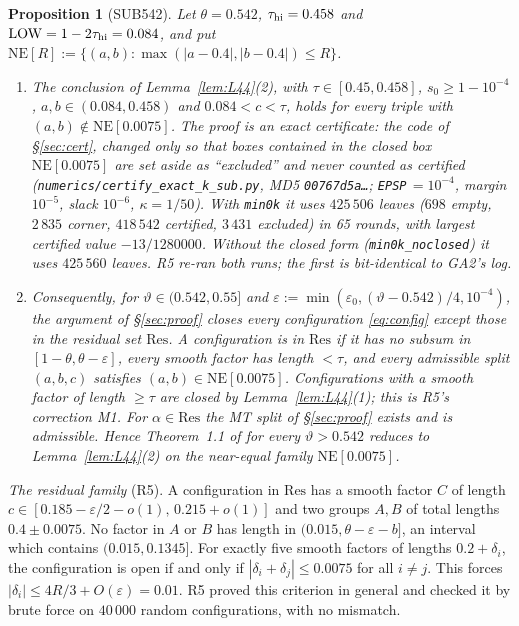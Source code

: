 \documentclass[11pt]{amsart}
\newtheorem{proposition}[theorem]{Proposition}
\theoremstyle{definition}
\theoremstyle{remark}
\newcommand{\e}{\varepsilon}
\newcommand{\Lfp}{Lemma~\ref{lem:L44}}
\begin{document}
\begin{proposition}[SUB542]\label{prop:sub542}
Let $\theta=0.542$, $\tau_{\rm hi}=0.458$ and $\mathrm{LOW}=1-2\tau_{\rm hi}=0.084$, and put
$\mathrm{NE}[R]:=\{(a,b):\max(|a-0.4|,|b-0.4|)\le R\}$.
\begin{enumerate}[label=(\roman*),leftmargin=*]
\item The conclusion of \Lfp(2), with $\tau\in[0.45,0.458]$, $s_0\ge1-10^{-4}$, $a,b\in(0.084,0.458)$ and $0.084<c<\tau$, holds for every
triple with $(a,b)\notin\mathrm{NE}[0.0075]$. The proof is an exact certificate: the code of \S\ref{sec:cert}, changed only so that boxes
contained in the closed box $\mathrm{NE}[0.0075]$ are set aside as ``excluded'' and never counted as certified
(\nolinkurl{numerics/certify_exact_k_sub.py}, MD5 \texttt{00767d5a\dots}; \texttt{EPSP}$\,=10^{-4}$, margin $10^{-5}$, slack $10^{-6}$, $\kappa=1/50$).
With \texttt{min0k} it uses $425\,506$ leaves ($698$ empty, $2\,835$ corner, $418\,542$ certified, $3\,431$ excluded) in 65 rounds, with largest
certified value $-13/1280000$. Without the closed form (\texttt{min0k\_noclosed}) it uses $425\,560$ leaves. R5 re-ran both runs; the first is
bit-identical to GA2's log.
\item Consequently, for $\vartheta\in(0.542,0.55]$ and $\e:=\min(\e_0,(\vartheta-0.542)/4,10^{-4})$, the argument of \S\ref{sec:proof} closes every
configuration \eqref{eq:config} except those in the residual set $\mathrm{Res}$. A configuration is in $\mathrm{Res}$ if it has no subsum in
$[1-\theta,\theta-\e]$, every smooth factor has length $<\tau$, and every admissible split $(a,b,c)$ satisfies $(a,b)\in\mathrm{NE}[0.0075]$.
Configurations with a smooth factor of length $\ge\tau$ are closed by \Lfp(1); this is R5's correction M1. For $\alpha\in\mathrm{Res}$ the MT split of
\S\ref{sec:proof} exists and is admissible. Hence Theorem~1.1 of \cite{MT} for every $\vartheta>0.542$ reduces to \Lfp(2) on the near-equal family
$\mathrm{NE}[0.0075]$.
\end{enumerate}
\end{proposition}

\emph{The residual family} (R5). A configuration in $\mathrm{Res}$ has a smooth factor $C$ of length $c\in[0.185-\e/2-o(1),\,0.215+o(1)]$
and two groups $A,B$ of total lengths $0.4\pm0.0075$. No factor in $A$ or $B$ has length in $(0.015,\theta-\e-b]$, an interval which contains
$(0.015,0.1345]$. For exactly five smooth factors of lengths $0.2+\delta_i$, the configuration is open if and only if $|\delta_i+\delta_j|\le0.0075$ for
all $i\ne j$. This forces $|\delta_i|\le4R/3+O(\e)=0.01$. R5 proved this criterion in general and checked it by brute force on $40\,000$ random
configurations, with no mismatch.
\end{document}

